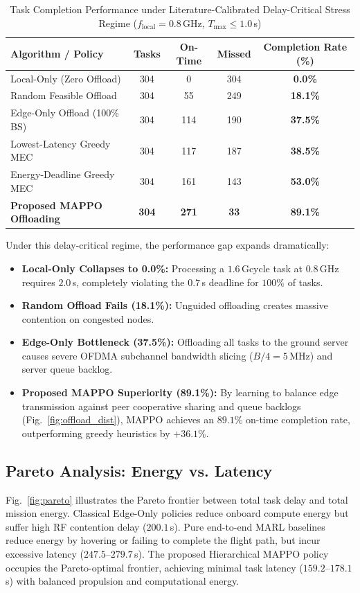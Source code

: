 \documentclass[conference]{IEEEtran}
\begin{document}
\begin{table}[!t]
\caption{Task Completion Performance under Literature-Calibrated Delay-Critical Stress Regime ($f_{\text{local}} = 0.8$\,GHz, $T_{\text{max}} \le 1.0$\,s)}
\label{tab:stress_results}
\centering
\scriptsize
\begin{tabular}{lcccc}
\toprule
\textbf{Algorithm / Policy} & \textbf{Tasks} & \textbf{On-Time} & \textbf{Missed} & \textbf{Completion Rate (\%)} \\
\midrule
Local-Only (Zero Offload) & 304 & 0 & 304 & \textbf{0.0\%} \\
Random Feasible Offload & 304 & 55 & 249 & \textbf{18.1\%} \\
Edge-Only Offload (100\% BS) & 304 & 114 & 190 & \textbf{37.5\%} \\
Lowest-Latency Greedy MEC & 304 & 117 & 187 & \textbf{38.5\%} \\
Energy-Deadline Greedy MEC & 304 & 161 & 143 & \textbf{53.0\%} \\
\textbf{Proposed MAPPO Offloading} & \textbf{304} & \textbf{271} & \textbf{33} & \textbf{89.1\%} \\
\bottomrule
\end{tabular}
\end{table}

Under this delay-critical regime, the performance gap expands dramatically:
\begin{itemize}
    \item \textbf{Local-Only Collapses to 0.0\%:} Processing a $1.6$\,Gcycle task at $0.8$\,GHz requires $2.0$\,s, completely violating the $0.7$\,s deadline for $100\%$ of tasks.
    \item \textbf{Random Offload Fails (18.1\%):} Unguided offloading creates massive contention on congested nodes.
    \item \textbf{Edge-Only Bottleneck (37.5\%):} Offloading all tasks to the ground server causes severe OFDMA subchannel bandwidth slicing ($B / 4 = 5$\,MHz) and server queue backlog.
    \item \textbf{Proposed MAPPO Superiority (89.1\%):} By learning to balance edge transmission against peer cooperative sharing and queue backlogs (Fig.~\ref{fig:offload_dist}), MAPPO achieves an $89.1\%$ on-time completion rate, outperforming greedy heuristics by $+36.1\%$.
\end{itemize}

\subsection{Pareto Analysis: Energy vs. Latency}
Fig.~\ref{fig:pareto} illustrates the Pareto frontier between total task delay and total mission energy. Classical Edge-Only policies reduce onboard compute energy but suffer high RF contention delay ($200.1$\,s). Pure end-to-end MARL baselines reduce energy by hovering or failing to complete the flight path, but incur excessive latency ($247.5$--$279.7$\,s). The proposed Hierarchical MAPPO policy occupies the Pareto-optimal frontier, achieving minimal task latency ($159.2$--$178.1$\,s) with balanced propulsion and computational energy.
\end{document}

